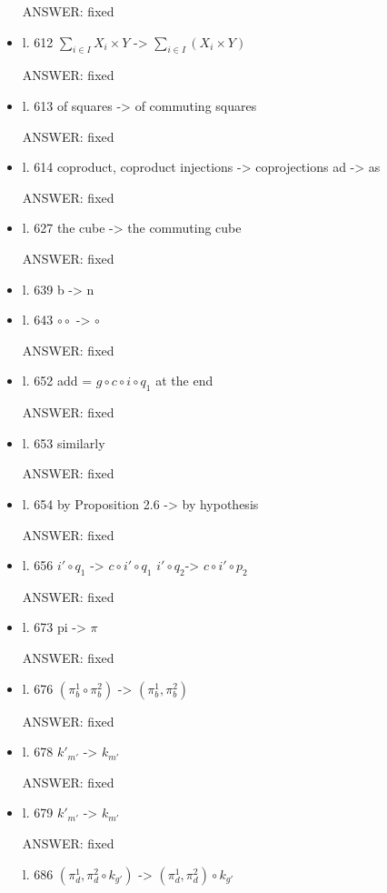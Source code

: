 \documentclass[english,11pt,a4paper]{article}
\begin{document}
\begin{itemize}
ANSWER: fixed

\item l. 612 $\sum_{i\in I}X_i\times Y$ -> $\sum_{i\in I}(X_i\times Y)$ 

ANSWER: fixed

\item l. 613 of squares -> of commuting squares

ANSWER: fixed

\item l. 614 coproduct, coproduct injections -> coprojections
ad -> as

ANSWER: fixed

\item l. 627 the cube -> the commuting cube

ANSWER: fixed

\item l. 639 b -> n

\item l. 643 $\circ\circ$ -> $\circ$

ANSWER: fixed

\item l. 652 add = $g \circ c \circ i \circ q_1$ at the end

ANSWER: fixed

\item l. 653 similarly

ANSWER: fixed

\item l. 654 by Proposition 2.6 -> by hypothesis

ANSWER: fixed

\item l. 656 $i' \circ q_1$ -> $c \circ i' \circ q_1$
$i' \circ q_2 $-> $c \circ i' \circ p_2$


ANSWER: fixed


\item l. 673 pi -> $\pi$

ANSWER: fixed

\item l. 676 $(\pi^1_b \circ \pi^2_b)$ -> $(\pi^1_b , \pi^2_b)$

ANSWER: fixed

\item  l. 678 $k'_{m'}$ -> $k_{m'}$

ANSWER: fixed

\item l. 679 $k'_{m'}$ -> $k_{m'}$

ANSWER: fixed

l. 686 $(\pi^1_d , \pi^2_d \circ k_{g'})$ -> $(\pi^1_d , \pi^2_d) \circ k_{g'}$


\end{itemize}
\end{document}
